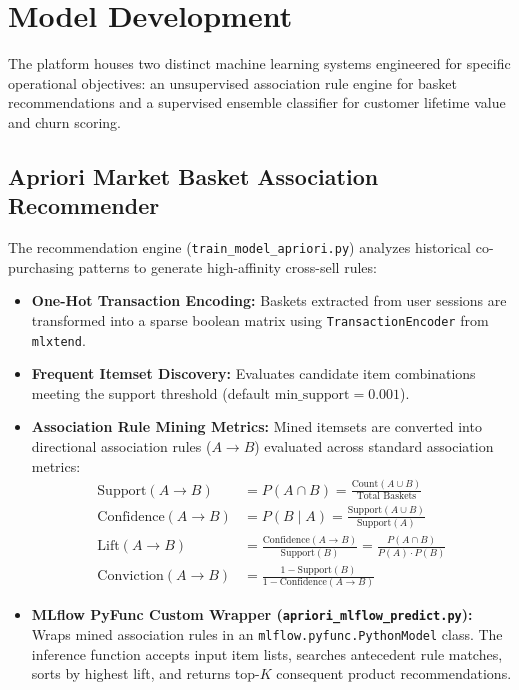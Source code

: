 \documentclass[11pt,a4paper]{article}
\begin{document}
\section{Model Development}

The platform houses two distinct machine learning systems engineered for specific operational objectives: an unsupervised association rule engine for basket recommendations and a supervised ensemble classifier for customer lifetime value and churn scoring.

\subsection{Apriori Market Basket Association Recommender}
The recommendation engine (\texttt{train\_model\_apriori.py}) analyzes historical co-purchasing patterns to generate high-affinity cross-sell rules:
\begin{itemize}
    \item \textbf{One-Hot Transaction Encoding:} Baskets extracted from user sessions are transformed into a sparse boolean matrix using \texttt{TransactionEncoder} from \texttt{mlxtend}.
    \item \textbf{Frequent Itemset Discovery:} Evaluates candidate item combinations meeting the support threshold (default $\text{min\_support} = 0.001$).
    \item \textbf{Association Rule Mining Metrics:} Mined itemsets are converted into directional association rules ($A \rightarrow B$) evaluated across standard association metrics:
    \begin{align}
        \text{Support}(A \rightarrow B) &= P(A \cap B) = \frac{\text{Count}(A \cup B)}{\text{Total Baskets}} \\
        \text{Confidence}(A \rightarrow B) &= P(B \mid A) = \frac{\text{Support}(A \cup B)}{\text{Support}(A)} \\
        \text{Lift}(A \rightarrow B) &= \frac{\text{Confidence}(A \rightarrow B)}{\text{Support}(B)} = \frac{P(A \cap B)}{P(A) \cdot P(B)} \\
        \text{Conviction}(A \rightarrow B) &= \frac{1 - \text{Support}(B)}{1 - \text{Confidence}(A \rightarrow B)}
    \end{align}
    \item \textbf{MLflow PyFunc Custom Wrapper (\texttt{apriori\_mlflow\_predict.py}):} Wraps mined association rules in an \texttt{mlflow.pyfunc.PythonModel} class. The inference function accepts input item lists, searches antecedent rule matches, sorts by highest lift, and returns top-$K$ consequent product recommendations.
\end{itemize}
\end{document}
